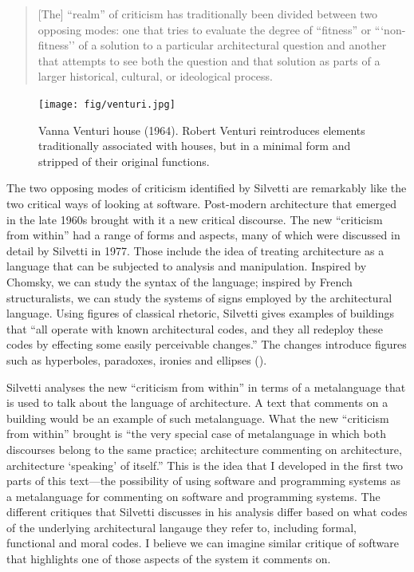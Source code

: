 \begin{quote}
[The] ``realm'' of criticism has traditionally been divided between two opposing modes: one
that tries to evaluate the degree of ``fitness'' or ```non-fitness'' of a solution
to a particular architectural question and another that attempts to see both the question and
that solution as parts of a larger historical, cultural, or ideological process.
\end{quote}

\begin{figure}
\centering
\vspace{-1em}
\texttt{[image: fig/venturi.jpg]}
\caption{Vanna Venturi house (1964). Robert Venturi reintroduces elements traditionally associated
with houses, but in a minimal form and stripped of their original functions.}
\label{fig:vanna}
\end{figure}

The two opposing modes of criticism identified by Silvetti are remarkably like the two critical
ways of looking at software. Post-modern architecture that emerged in the late 1960s brought with
it a new critical discourse. The new ``criticism from within'' had a range of forms and
aspects, many of which were discussed in detail by Silvetti in 1977. Those include the idea of
treating architecture as a language that can be subjected to analysis and manipulation.
Inspired by Chomsky, we can study the syntax of the language; inspired by French structuralists,
we can study the systems of signs employed by the architectural language.
Using figures of classical rhetoric, Silvetti gives examples of buildings that ``all operate
with known architectural codes, and they all redeploy these codes by effecting some easily
perceivable changes.'' The changes introduce figures such as hyperboles,
paradoxes, ironies and ellipses ().

Silvetti analyses the new ``criticism from within'' in terms of a metalanguage that is
used to talk about the language of architecture. A text that comments on a building would be
an example of such metalanguage. What the new ``criticism from within'' brought is
``the very special case of metalanguage in which both discourses belong to the same practice;
architecture commenting on architecture, architecture `speaking' of itself.''
This is the idea that I developed in the first two parts of this text---the possibility of
using software and programming systems as a metalanguage for commenting on software and
programming systems. The different critiques that Silvetti discusses in his analysis differ
based on what codes of the underlying architectural langauge they refer to, including
formal, functional and moral codes. I believe we can imagine similar critique of software
that highlights one of those aspects of the system it comments on.


